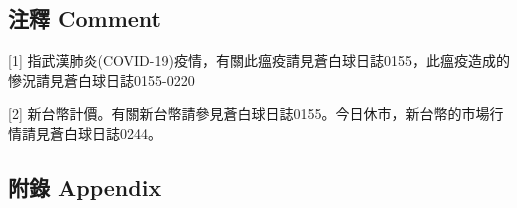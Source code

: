 \documentclass[a5paper, 11pt
]{book}
\begin{document}
\hypertarget{ux6ce8ux91cb-comment-91}{%
\subsection{注釋 Comment}\label{ux6ce8ux91cb-comment-91}}

{[}1{]}
指武漢肺炎(COVID-19)疫情，有關此瘟疫請見蒼白球日誌0155，此瘟疫造成的慘況請見蒼白球日誌0155-0220

{[}2{]}
新台幣計價。有關新台幣請參見蒼白球日誌0155。今日休市，新台幣的市場行情請見蒼白球日誌0244。

\hypertarget{ux9644ux9304-appendix-91}{%
\subsection{附錄 Appendix}\label{ux9644ux9304-appendix-91}}
\end{document}
